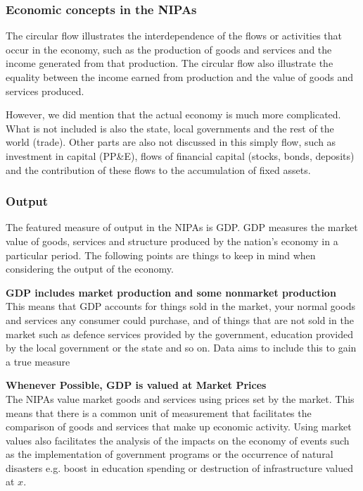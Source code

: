 \documentclass[12pt, letterpaper]{article}
\begin{document}
{\subsubsection{Economic concepts in the NIPAs}
The circular flow illustrates the interdependence of the flows or activities that occur in the economy, such as the production of goods and services and the income generated from that production. The circular flow also illustrate the equality between the income earned from production and the value of goods and services produced.

\vspace{10pt}
\noindent However, we did mention that the actual economy is much more complicated. What is not included is also the state, local governments and the rest of the world (trade). Other parts are also not discussed in this simply flow, such as investment in capital (PP\&E), flows of financial capital (stocks, bonds, deposits) and the contribution of these flows to the accumulation of fixed assets.

\subsubsection{Output}
The featured measure of output in the NIPAs is GDP. GDP measures the market value of goods, services and structure produced by the nation's economy in a particular period. The following points are things to keep in mind when considering the output of the economy.

\vspace{10pt}
\noindent\textbf{GDP includes market production and some nonmarket production}\\
This means that GDP accounts for things sold in the market, your normal goods and services any consumer could purchase, and of things that are not sold in the market such as defence services provided by the government, education provided by the local government or the state and so on. Data aims to include this to gain a true measure

\vspace{10pt}
\noindent\textbf{Whenever Possible, GDP is valued at Market Prices}\\
The NIPAs value market goods and services using prices set by the market. This means that there is a common unit of measurement that facilitates the comparison of goods and services that make up economic activity. Using market values also facilitates the analysis of the impacts on the economy of events such as the implementation of government programs or the occurrence of natural disasters e.g. boost in education spending or destruction of infrastructure valued at $x$.

}
\end{document}
